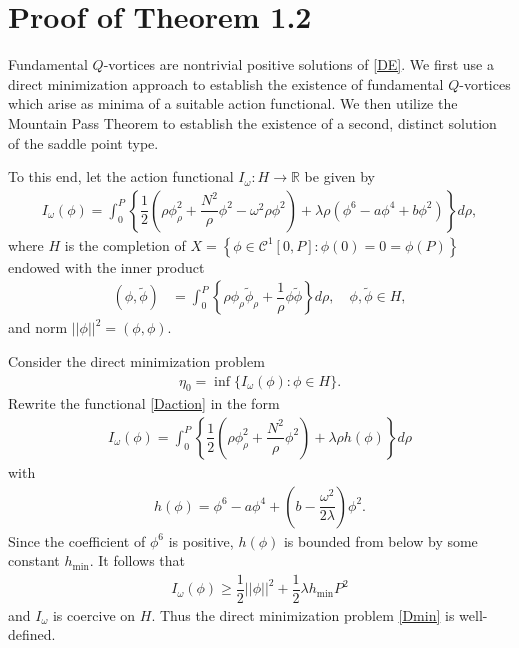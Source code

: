 \documentclass[12pt]{article}
\begin{document}
	
	\section{Proof of Theorem 1.2}
	\setcounter{equation}{0}
	Fundamental $Q$-vortices are nontrivial positive solutions of \eqref{DE}. We first use a direct minimization approach to establish the existence of fundamental $Q$-vortices which arise as minima of a suitable action functional. We then utilize the Mountain Pass Theorem to establish the existence of a second, distinct solution of the saddle point type.
	
	To this end, let the action functional $I_{\omega}:H\rightarrow\mathbb{R}$ be given by
	\begin{align}
		I_{\omega}(\phi)=\int_0^{P}\left\{\dfrac{1}{2}\left(\rho\phi_{\rho}^2+\dfrac{N^2}{\rho}\phi^2-\omega^2\rho\phi^2\right)+\lambda\rho(\phi^6-a\phi^4+b\phi^2)\right\}d\rho,\label{Daction}
	\end{align}
	where $H$ is the completion of $X=\left\{\phi\in\mathcal{C}^1[0,P]: \phi(0)=0=\phi(P)\right\}$ endowed with the inner product
	\begin{align}
		(\phi,\tilde{\phi})&=\int_0^P\left\{\rho \phi_{\rho}\tilde{\phi}_{\rho}+\dfrac{1}{\rho}\phi\tilde{\phi} \right\}d\rho,\quad \phi,\tilde{\phi}\in H,\label{innerP}
	\end{align}
	and norm $||\phi||^2=(\phi,\phi)$.
	
	Consider the direct minimization problem
	\begin{align}
		\eta_0=\inf\{I_{\omega}(\phi):\phi\in H\}.\label{Dmin}
	\end{align}
	Rewrite the functional \eqref{Daction} in the form
	\begin{align}
		I_{\omega}(\phi)=\int_0^{P}\left\{\dfrac{1}{2}\left(\rho\phi_{\rho}^2+\dfrac{N^2}{\rho}\phi^2\right)+\lambda\rho h(\phi)\right\}d\rho
	\end{align}
	with
	\begin{align}
		h(\phi)=\phi^6-a\phi^4+\left(b-\dfrac{\omega^2}{2\lambda}\right)\phi^2.
	\end{align}
	Since the coefficient of $\phi^6$ is positive, $h(\phi)$ is bounded from below by some constant $h_{\min}$. It follows that
	\begin{align}
		I_{\omega}(\phi)\geq\dfrac{1}{2}||\phi||^2+\dfrac{1}{2}\lambda h_{\min}P^2\label{coercive}
	\end{align}
	and $I_{\omega}$ is coercive on $H$. Thus the direct minimization problem \eqref{Dmin} is well-defined.
	
\end{document}
